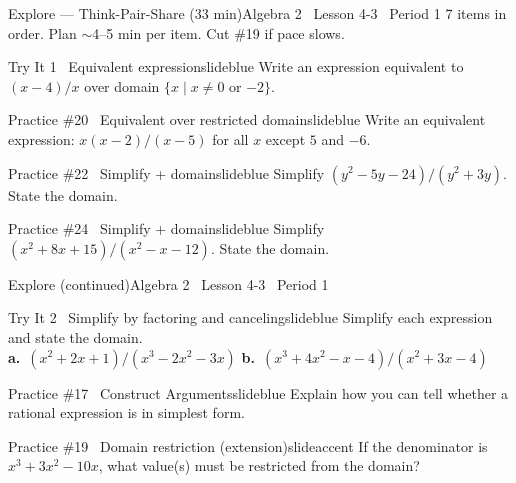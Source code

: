 \documentclass[aspectratio=169, 11pt]{beamer}
\begin{document}
\begin{frame}{Explore --- Think-Pair-Share (33 min)}{Algebra 2 \textperiodcentered\ Lesson 4-3 \textperiodcentered\ Period 1}
\small\textcolor{slidegray}{7 items in order. Plan \(\sim\)4--5 min per item. Cut \#19 if pace slows.}

\vspace{0.1cm}
\begin{projcard}{Try It 1 \textperiodcentered\ Equivalent expression}{slideblue}
Write an expression equivalent to \((x-4)/x\) over domain \(\{x \mid x \ne 0 \text{ or } {-2}\}\).
\end{projcard}
\vspace{-0.15cm}
\begin{projcard}{Practice \#20 \textperiodcentered\ Equivalent over restricted domain}{slideblue}
Write an equivalent expression: \(x(x-2)/(x-5)\) for all \(x\) except \(5\) and \(-6\).
\end{projcard}
\vspace{-0.15cm}
\begin{projcard}{Practice \#22 \textperiodcentered\ Simplify + domain}{slideblue}
Simplify \((y^2-5y-24)/(y^2+3y)\). State the domain.
\end{projcard}
\vspace{-0.15cm}
\begin{projcard}{Practice \#24 \textperiodcentered\ Simplify + domain}{slideblue}
Simplify \((x^2+8x+15)/(x^2-x-12)\). State the domain.
\end{projcard}
\end{frame}

\begin{frame}{Explore (continued)}{Algebra 2 \textperiodcentered\ Lesson 4-3 \textperiodcentered\ Period 1}
\vspace{0.2cm}
\begin{projcard}{Try It 2 \textperiodcentered\ Simplify by factoring and canceling}{slideblue}
Simplify each expression and state the domain.\\[4pt]
\textbf{a.}\ \((x^2+2x+1)/(x^3-2x^2-3x)\)
\hfill
\textbf{b.}\ \((x^3+4x^2-x-4)/(x^2+3x-4)\)
\end{projcard}
\vspace{0.1cm}
\begin{projcard}{Practice \#17 \textperiodcentered\ Construct Arguments}{slideblue}
Explain how you can tell whether a rational expression is in simplest form.
\end{projcard}
\vspace{0.1cm}
\begin{projcard}{Practice \#19 \textperiodcentered\ Domain restriction (extension)}{slideaccent}
If the denominator is \(x^3+3x^2-10x\), what value(s) must be restricted from the domain?
\end{projcard}
\end{frame}
\end{document}
